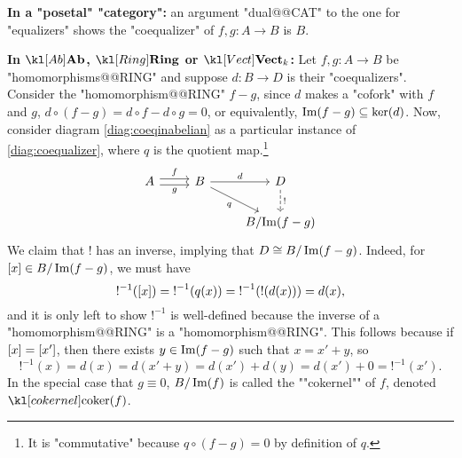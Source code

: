 \documentclass[main.tex]{subfiles}
\begin{document}
\begin{exmps}
    \textbf{In a "posetal" "category":} an argument "dual@@CAT" to the one for "equalizers" shows the "coequalizer" of $f,g:A \rightarrow B$ is $B$.

    \textbf{In $\catAb$, $\catRing$ or $\catVect{k}$:} Let $f,g: A \rightarrow B$ be "homomorphisms@@RING" and suppose $d:B \rightarrow D$ is their "coequalizers". Consider the "homomorphism@@RING" $f-g$, since $d$ makes a "cofork" with $f$ and $g$, $d \circ (f-g) = d\circ f - d \circ g= 0$, or equivalently, $\operatorname{Im}(f-g) \subseteq \ker(d)$. Now, consider diagram \eqref{diag:coeqinabelian} as a particular instance of \eqref{diag:coequalizer}, where $q$ is the quotient map.\footnote{It is "commutative" because $q\circ (f-g) = 0$ by definition of $q$.}
    \begin{equation}\label{diag:coeqinabelian}
        \begin{tikzcd}
            A \arrow[r, "f", shift left] \arrow[r, "g"', shift right] & B \arrow[r, "d"] \arrow[rd, "q"'] & D \arrow[d, "!", dashed] \\& & B/{\im(f-g)}
        \end{tikzcd}
    \end{equation}
    We claim that $!$ has an inverse, implying that $D \cong B/\operatorname{Im}(f-g)$. Indeed, for $\left[ x \right] \in B/\operatorname{Im}(f-g)$, we must have 
    \[!^{-1}(\left[ x \right]) = {!}^{-1}(q(x)) = {!}^{-1}(!(d(x)))= d(x),\]
    and it is only left to show $!^{-1}$ is well-defined because the inverse of a "homomorphism@@RING" is a "homomorphism@@RING". This follows because if $\left[ x \right] = \left[ x' \right]$, then there exists $y \in \operatorname{Im}(f-g)$ such that $x = x' + y$, so \[!^{-1}(x) = d(x) = d(x'+y) = d(x') +d(y) = d(x') + 0 = {!}^{-1}(x').\]
    \AP In the special case that $g \equiv 0$, $B/\operatorname{Im}(f)$ is called the ""cokernel"" of $f$, denoted $\coker(f)$.




\end{exmps}
\end{document}
